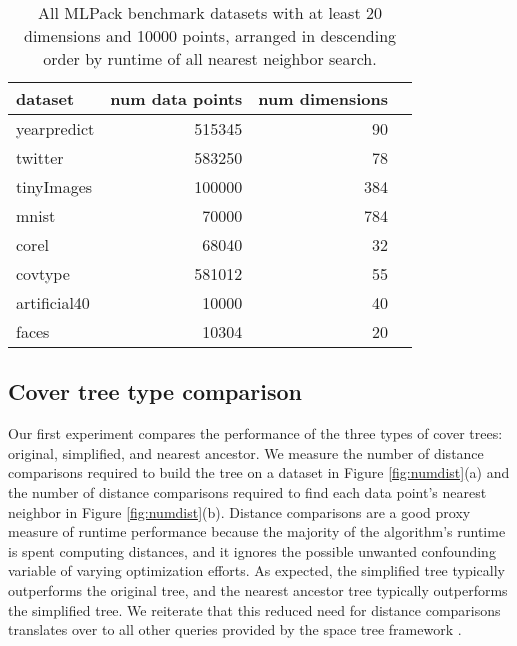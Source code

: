 \documentclass[thesis.tex]{subfiles}
\begin{document}

\begin{table}[t]
\centering
\begin{tabular}{lrrr}
dataset & num data points & num dimensions \\
\hline
yearpredict  & 515345& 90   \\
twitter      & 583250& 78   \\
tinyImages   & 100000& 384  \\
mnist        & 70000 & 784  \\
corel        & 68040 & 32   \\
covtype      & 581012& 55   \\
artificial40 & 10000 & 40   \\
faces        & 10304 & 20   \\
\end{tabular}
\caption{
    All MLPack benchmark datasets with at least 20 dimensions and 10000
points, arranged in descending order by runtime of all nearest neighbor search.
    }
\label{tab:datasets}
\end{table}



\subsection{Cover tree type comparison}

Our first experiment compares the performance of the three types of cover trees: original, simplified, and nearest ancestor.
We measure the number of distance comparisons required to build the tree on a dataset in Figure \ref{fig:numdist}(a)
and the number of distance comparisons required to find each data point's nearest neighbor in Figure \ref{fig:numdist}(b). 
Distance comparisons are a good proxy measure of runtime performance because the majority of the algorithm's runtime is spent computing distances, and it ignores the possible unwanted confounding variable of varying optimization efforts.
As expected, the simplified tree typically outperforms the original tree, and the nearest ancestor tree typically outperforms the simplified tree.
We reiterate that this reduced need for distance comparisons translates over to all other queries provided by the space tree framework \cite{Curtin2013}.

\end{document}
